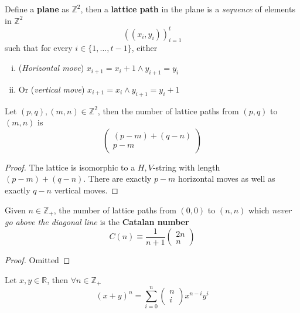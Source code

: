 \documentclass{article}
\def\Z{{\mathbb Z}}
\def\R{{\mathbb R}}
\newcommand{\bi}[2]{\begin{pmatrix}{#1}\\{#2}\end{pmatrix}}
\begin{document}
		\begin{definition}
			Define a \textbf{plane} as $\Z^2$, then a \textbf{lattice path} in the plane is a \emph{sequence} of elements in $\Z^2$
			\begin{equation}
				((x_i, y_i))_{i=1}^t
			\end{equation}
			such that for every $i \in \{1,\dots,t-1\}$, either
			\begin{enumerate}[(i)]
				\item (\emph{Horizontal move}) $x_{i+1} = x_i + 1 \land y_{i+1} = y_i$
				\item Or (\emph{vertical move}) $x_{i+1} = x_i \land y_{i+1} = y_i + 1$
			\end{enumerate}
		\end{definition}
		
		\begin{lemma}
			Let $(p, q), (m, n) \in \Z^2$, then the number of lattice paths from $(p, q)$ to $(m, n)$ is 
			\begin{equation}
				\bi{(p-m) + (q-n)}{p-m}
			\end{equation}
			\begin{proof}
				The lattice is isomorphic to a ${H, V}$-string with length $(p-m)+(q-n)$. There are exactly $p-m$ horizontal moves as well as exactly $q-n$ vertical moves.
			\end{proof}
		\end{lemma}
		
		\begin{theorem}
			Given $n \in \Z_+$, the number of lattice paths from $(0,0)$ to $(n,n)$ which \emph{never go above the diagonal line} is the \textbf{Catalan number}
			\begin{equation}
				C(n) \equiv \frac{1}{n+1} \bi{2n}{n}
			\end{equation}
			\begin{proof}
				Omitted
			\end{proof}
		\end{theorem}
		
		\begin{theorem}
			Let $x, y \in \R$, then $\forall n \in \Z_+$
			\begin{equation}
				(x + y)^n = \sum_{i=0}^n \bi{n}{i} x^{n-i} y^i
			\end{equation}
		\end{theorem}
		
\end{document}

